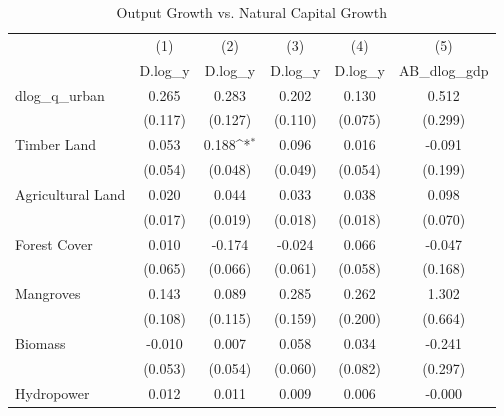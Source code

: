 \begin{table}[htbp]\centering
\def\sym#1{\ifmmode^{#1}\else\(^{#1}\)\fi}
\caption{Output Growth vs. Natural Capital Growth}
\begin{tabular}{l*{5}{c}}
\hline\hline
            &\multicolumn{1}{c}{(1)}&\multicolumn{1}{c}{(2)}&\multicolumn{1}{c}{(3)}&\multicolumn{1}{c}{(4)}&\multicolumn{1}{c}{(5)}\\
            &\multicolumn{1}{c}{D.log\_y}&\multicolumn{1}{c}{D.log\_y}&\multicolumn{1}{c}{D.log\_y}&\multicolumn{1}{c}{D.log\_y}&\multicolumn{1}{c}{AB\_dlog\_gdp}\\
\hline
dlog\_q\_urban&       0.265       &       0.283       &       0.202       &       0.130       &       0.512       \\
            &     (0.117)       &     (0.127)       &     (0.110)       &     (0.075)       &     (0.299)       \\
[1em]
Timber Land&       0.053       &       0.188\sym{*}&       0.096       &       0.016       &      -0.091       \\
            &     (0.054)       &     (0.048)       &     (0.049)       &     (0.054)       &     (0.199)       \\
[1em]
Agricultural Land   &       0.020       &       0.044       &       0.033       &       0.038       &       0.098       \\
            &     (0.017)       &     (0.019)       &     (0.018)       &     (0.018)       &     (0.070)       \\
[1em]
Forest Cover&       0.010       &      -0.174       &      -0.024       &       0.066       &      -0.047       \\
            &     (0.065)       &     (0.066)       &     (0.061)       &     (0.058)       &     (0.168)       \\
[1em]
Mangroves&       0.143       &       0.089       &       0.285       &       0.262       &       1.302       \\
            &     (0.108)       &     (0.115)       &     (0.159)       &     (0.200)       &     (0.664)       \\
[1em]
Biomass    &      -0.010       &       0.007       &       0.058       &       0.034       &      -0.241       \\
            &     (0.053)       &     (0.054)       &     (0.060)       &     (0.082)       &     (0.297)       \\
[1em]
Hydropower &       0.012       &       0.011       &       0.009       &       0.006       &      -0.000       \\

\end{tabular}
\end{table}
